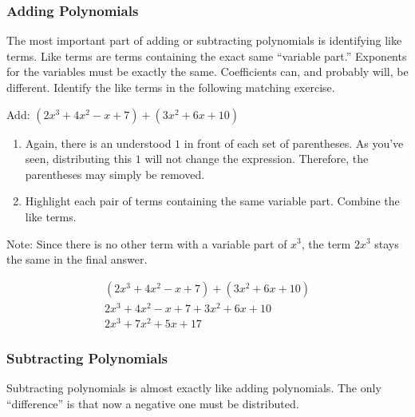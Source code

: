 
\subsubsection*{Adding Polynomials}

The most important part of adding or subtracting polynomials is identifying
like terms. Like terms are terms containing the exact same “variable part.”
Exponents for the variables must be exactly the same. Coefficients can, and
probably will, be different. Identify the like terms in the following matching
exercise.

\begin{example}
    Add: $(2x^3 + 4x^2 - x + 7) + (3x^2 + 6x + 10)$
    
    \begin{enumerate}
        \item Again, there is an understood $1$ in front of each set of
            parentheses. As you've seen, distributing this $1$ will not change
            the expression. Therefore, the parentheses may simply be removed.
        \item Highlight each pair of terms containing the same variable part.
            Combine the like terms.
    \end{enumerate}

    Note: Since there is no other term with a variable part of $x^3$, the term
    $2x^3$ stays the same in the final answer.
    
    \begin{align*}
        (2x^3 + 4x^2 - x + 7) + (3x^2 + 6x + 10) \\
        2x^3 + 4x^2 - x + 7 + 3x^2 + 6x + 10 \\
        2x^3 + 7x^2 + 5x + 17
    \end{align*}
\end{example}

\subsubsection*{Subtracting Polynomials}

Subtracting polynomials is almost exactly like adding polynomials. The only
“difference” is that now a negative one must be distributed.

